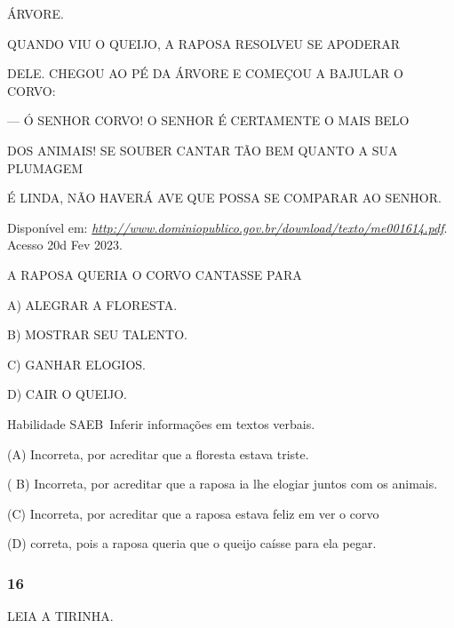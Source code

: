 \begin{escola}
ÁRVORE.

QUANDO VIU O QUEIJO, A RAPOSA RESOLVEU SE APODERAR

DELE. CHEGOU AO PÉ DA ÁRVORE E COMEÇOU A BAJULAR O CORVO:

--- Ó SENHOR CORVO! O SENHOR É CERTAMENTE O MAIS BELO

DOS ANIMAIS! SE SOUBER CANTAR TÃO BEM QUANTO A SUA PLUMAGEM

É LINDA, NÃO HAVERÁ AVE QUE POSSA SE COMPARAR AO SENHOR.

Disponível em:
\href{http://www.dominiopublico.gov.br/download/texto/me001614.pdf}{\emph{http://www.dominiopublico.gov.br/download/texto/me001614.pdf}}.
Acesso 20d Fev 2023.

A RAPOSA QUERIA O CORVO CANTASSE PARA

A) ALEGRAR A FLORESTA.

B) MOSTRAR SEU TALENTO.

C) GANHAR ELOGIOS.

D) CAIR O QUEIJO.

Habilidade SAEB~Inferir informações em textos verbais.

(A) Incorreta, por acreditar que a floresta estava triste.

( B) Incorreta, por acreditar que a raposa ia lhe elogiar juntos com os
animais.

(C) Incorreta, por acreditar que a raposa estava feliz em ver o corvo

(D) correta, pois a raposa queria que o queijo caísse para ela
pegar.\protect\hypertarget{_heading=h.jen2jvep4ux3}{}{}

\subsubsection{16}\label{section-72}

LEIA A TIRINHA.


\end{escola}
